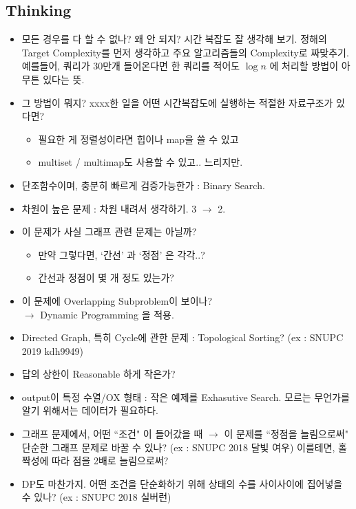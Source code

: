 \documentclass[landscape,8pt]{article}
\begin{document}
\begin{multicols}{2}
  \subsection{Thinking}
    \begin{itemize}
      \item 모든 경우를 다 할 수 없나? 왜 안 되지? 시간 복잡도 잘 생각해 보기. 정해의 Target Complexity를 먼저 생각하고 주요 알고리즘들의 Complexity로 짜맞추기.\\
      예를들어, 쿼리가 30만개 들어온다면 한 쿼리를 적어도 $\log{n}$ 에 처리할 방법이 아무튼 있다는 뜻.
      \item 그 방법이 뭐지? xxxx한 일을 어떤 시간복잡도에 실행하는 적절한 자료구조가 있다면?
      \begin{itemize}
        \item 필요한 게 정렬성이라면 힙이나 map을 쓸 수 있고
        \item multiset / multimap도 사용할 수 있고.. 느리지만.
      \end{itemize}
      \item 단조함수이며, 충분히 빠르게 검증가능한가 : Binary Search.
      \item 차원이 높은 문제 : 차원 내려서 생각하기. 3 $\rightarrow$ 2.
      \item 이 문제가 사실 그래프 관련 문제는 아닐까?
        \begin{itemize}
          \item 만약 그렇다면, `간선' 과 `정점' 은 각각..?
          \item 간선과 정점이 몇 개 정도 있는가?
        \end{itemize}
      \item 이 문제에 Overlapping Subproblem이 보이나? \\$\rightarrow$ Dynamic Programming 을 적용.
      \item Directed Graph, 특히 Cycle에 관한 문제 : Topological Sorting? (ex : SNUPC 2019 kdh9949)
      \item 답의 상한이 Reasonable 하게 작은가?
      \item output이 특정 수열/OX 형태 : 작은 예제를 Exhasutive Search. 모르는 무언가를 알기 위해서는 데이터가 필요하다.
      \item 그래프 문제에서, 어떤 ``조건" 이 들어갔을 때 $\to$ 이 문제를 ``정점을 늘림으로써" 단순한 그래프 문제로 바꿀 수 있나? (ex : SNUPC 2018 달빛 여우) 이를테면, 홀짝성에 따라 점을 2배로 늘림으로써?
      \item DP도 마찬가지. 어떤 조건을 단순화하기 위해 상태의 수를 사이사이에 집어넣을 수 있나? (ex : SNUPC 2018 실버런)

\end{itemize}
\end{multicols}
\end{document}
